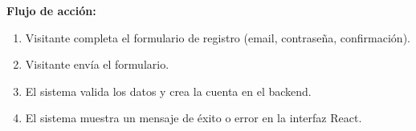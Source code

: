 \begin{userstory}[hu:01]
{		\textbf{Flujo de acción:}
		\begin{enumerate}
			\item Visitante completa el formulario de registro (email, contraseña, confirmación).
			\item Visitante envía el formulario.
			\item El sistema valida los datos y crea la cuenta en el backend.
			\item El sistema muestra un mensaje de éxito o error en la interfaz React.
		\end{enumerate}
	}
\end{userstory}

